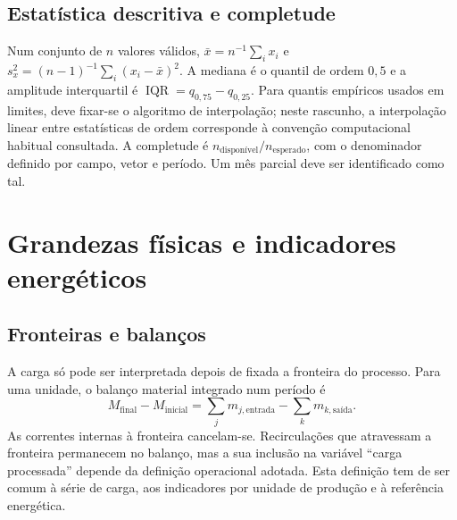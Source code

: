 \subsection{Estatística descritiva e completude}
\label{sec:mat-descritiva}
Num conjunto de $n$ valores válidos, $\bar x=n^{-1}\sum_i x_i$ e $s_x^2=(n-1)^{-1}\sum_i(x_i-\bar x)^2$. A mediana é o quantil de ordem $0{,}5$ e a amplitude interquartil é $\operatorname{IQR}=q_{0,75}-q_{0,25}$. Para quantis empíricos usados em limites, deve fixar-se o algoritmo de interpolação; neste rascunho, a interpolação linear entre estatísticas de ordem corresponde à convenção computacional habitual consultada. A completude é $n_{\mathrm{disponível}}/n_{\mathrm{esperado}}$, com o denominador definido por campo, vetor e período. Um mês parcial deve ser identificado como tal.


\section{Grandezas físicas e indicadores energéticos}
\label{sec:mat-energia}

\subsection{Fronteiras e balanços}
\label{sec:mat-balancos}
A carga só pode ser interpretada depois de fixada a fronteira do processo. Para uma unidade, o balanço material integrado num período é
\begin{equation}
M_{\mathrm{final}}-M_{\mathrm{inicial}}
=\sum_j m_{j,\mathrm{entrada}}-\sum_k m_{k,\mathrm{saída}}.
\label{eq:mat-balanco-material}
\end{equation}
As correntes internas à fronteira cancelam-se. Recirculações que atravessam a fronteira permanecem no balanço, mas a sua inclusão na variável ``carga processada'' depende da definição operacional adotada. Esta definição tem de ser comum à série de carga, aos indicadores por unidade de produção e à referência energética.

